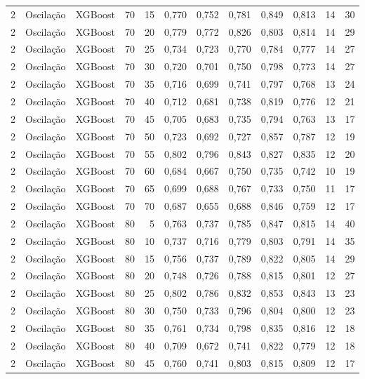 \begin{longtable}{@{}rllrrrrrrrrr@{}}
2 & Oscilação & XGBoost & 70 & 15 & 0,770 & 0,752 & 0,781 & 0,849 & 0,813 & 14 & 30 \\
2 & Oscilação & XGBoost & 70 & 20 & 0,779 & 0,772 & 0,826 & 0,803 & 0,814 & 14 & 29 \\
2 & Oscilação & XGBoost & 70 & 25 & 0,734 & 0,723 & 0,770 & 0,784 & 0,777 & 14 & 27 \\
2 & Oscilação & XGBoost & 70 & 30 & 0,720 & 0,701 & 0,750 & 0,798 & 0,773 & 14 & 27 \\
2 & Oscilação & XGBoost & 70 & 35 & 0,716 & 0,699 & 0,741 & 0,797 & 0,768 & 13 & 24 \\
2 & Oscilação & XGBoost & 70 & 40 & 0,712 & 0,681 & 0,738 & 0,819 & 0,776 & 12 & 21 \\
2 & Oscilação & XGBoost & 70 & 45 & 0,705 & 0,683 & 0,735 & 0,794 & 0,763 & 13 & 17 \\
2 & Oscilação & XGBoost & 70 & 50 & 0,723 & 0,692 & 0,727 & 0,857 & 0,787 & 12 & 19 \\
2 & Oscilação & XGBoost & 70 & 55 & 0,802 & 0,796 & 0,843 & 0,827 & 0,835 & 12 & 20 \\
2 & Oscilação & XGBoost & 70 & 60 & 0,684 & 0,667 & 0,750 & 0,735 & 0,742 & 10 & 19 \\
2 & Oscilação & XGBoost & 70 & 65 & 0,699 & 0,688 & 0,767 & 0,733 & 0,750 & 11 & 17 \\
2 & Oscilação & XGBoost & 70 & 70 & 0,687 & 0,655 & 0,688 & 0,846 & 0,759 & 12 & 17 \\
2 & Oscilação & XGBoost & 80 & 5 & 0,763 & 0,737 & 0,785 & 0,847 & 0,815 & 14 & 40 \\
2 & Oscilação & XGBoost & 80 & 10 & 0,737 & 0,716 & 0,779 & 0,803 & 0,791 & 14 & 35 \\
2 & Oscilação & XGBoost & 80 & 15 & 0,756 & 0,737 & 0,789 & 0,822 & 0,805 & 14 & 29 \\
2 & Oscilação & XGBoost & 80 & 20 & 0,748 & 0,726 & 0,788 & 0,815 & 0,801 & 12 & 27 \\
2 & Oscilação & XGBoost & 80 & 25 & 0,802 & 0,786 & 0,832 & 0,853 & 0,843 & 13 & 23 \\
2 & Oscilação & XGBoost & 80 & 30 & 0,750 & 0,733 & 0,796 & 0,804 & 0,800 & 12 & 23 \\
2 & Oscilação & XGBoost & 80 & 35 & 0,761 & 0,734 & 0,798 & 0,835 & 0,816 & 12 & 18 \\
2 & Oscilação & XGBoost & 80 & 40 & 0,709 & 0,672 & 0,741 & 0,822 & 0,779 & 12 & 18 \\
2 & Oscilação & XGBoost & 80 & 45 & 0,760 & 0,741 & 0,803 & 0,815 & 0,809 & 12 & 17 \\

\end{longtable}

